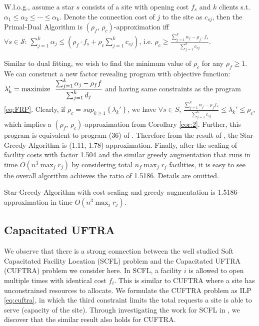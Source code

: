 \documentclass[10pt]{llncs}
\begin{document}
\begin{corollary}
W.l.o.g., assume a star $s$ consists of a site with opening cost
$f_{s}$ and $k$ clients s.t. $\alpha_{1}\leq\alpha_{2}\leq\cdots\leq\alpha_{k}$.
Denote the connection cost of $j$ to the site as $c_{sj}$, then
the Primal-Dual Algorithm is $\left(\rho_{f},\,\rho_{c}\right)$-approximation
iff $\forall s\in\mathcal{S}:\,\sum_{j=1}^{k}\alpha_{j}\leq\left(\rho_{f}\cdot f_{s}+\rho_{c}\sum_{j=1}^{k}c_{sj}\right)$,
i.e. $\rho_{c}\geq\frac{\sum_{j=1}^{k}\alpha_{j}-\rho_{f}\cdot f_{s}}{\sum_{j=1}^{k}c_{sj}}$.\label{cor:2}
\end{corollary}
Similar to dual fitting, we wish to find the minimum value of $\rho_{c}$
for any $\rho_{f}\geq1$. We can construct a new factor revealing
program with objective function: $\lambda_{k}'=\textrm{maximize\,\,\,\,}{\displaystyle \frac{\sum_{j=1}^{k}\alpha_{j}-\rho_{f}f}{\sum_{j=1}^{k}d_{j}}}$
and having same constraints as the program \eqref{eq:FRP}. Clearly,
if $\rho_{c}=sup_{k\geq1}\left\{ \lambda_{k}'\right\} $, we have
$\forall s\in S,\,{\displaystyle {\displaystyle \frac{\sum_{j=1}^{k}\alpha_{j}-\rho_{f}f_{s}}{\sum_{j=1}^{k}c_{sj}}}\leq\lambda_{k}'\leq\rho_{c}}$,
which implies a $\left(\rho_{f},\,\rho_{c}\right)$-approximation
from Corollary \ref{cor:2}. Further, this program is equivalent to
program (36) of \cite{Jain03dualfitting}. Therefore from the result
of \cite{Mahdian021.52}, the Star-Greedy Algorithm is (1.11, 1.78)-approximation.
Finally, after the scaling of facility costs with factor 1.504 and
the similar greedy augmentation that runs in time $O\left(n^{3}\max_{j}r_{j}\right)$
by considering total $n_{f}\max_{j}r_{j}$ facilities, it is easy
to see the overall algorithm achieves the ratio of 1.5186. Details
are omitted.
\begin{theorem}
Star-Greedy Algorithm with cost scaling and greedy augmentation is
1.5186-approximation in time $O\left(n^{3}\max_{j}r_{j}\right)$.
\end{theorem}

\subsection{Capacitated UFTRA }

We observe that there is a strong connection between the well studied
Soft Capacitated Facility Location (SCFL) problem \cite{Shmoys97FL,jain01approximation,Mahdian021.52}
and the Capacitated UFTRA (CUFTRA) problem we consider here. In SCFL,
a facility $i$ is allowed to open multiple times with identical cost
$f_{i}$. This is similar to CUFTRA where a site has unconstrained
resources to allocate. We formulate the CUFTRA problem as ILP \eqref{eq:cuftra},
in which the third constraint limits the total requests a site is
able to serve (capacity of the site). Through investigating the work
for SCFL in \cite{Mahdian021.52}, we discover that the similar result
also holds for CUFTRA.
\end{document}
